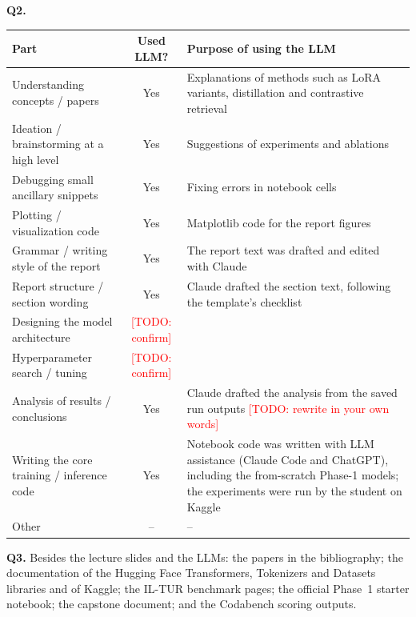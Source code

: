 \documentclass[10pt,a4paper]{article}
\newcommand{\todo}[1]{\textcolor{red}{[TODO: #1]}}
\begin{document}
\medskip\noindent\textbf{Q2.}
\begin{center}\small
\begin{tabular}{@{}p{4.6cm}|c|p{8.4cm}@{}}
\toprule
Part & Used LLM? & Purpose of using the LLM\\\midrule
Understanding concepts / papers & Yes & Explanations of methods such as LoRA variants, distillation and contrastive retrieval\\
Ideation / brainstorming at a high level & Yes & Suggestions of experiments and ablations\\
Debugging small ancillary snippets & Yes & Fixing errors in notebook cells\\
Plotting / visualization code & Yes & Matplotlib code for the report figures\\
Grammar / writing style of the report & Yes & The report text was drafted and edited with Claude\\
Report structure / section wording & Yes & Claude drafted the section text, following the template's checklist\\
Designing the model architecture & \todo{confirm} & \\
Hyperparameter search / tuning & \todo{confirm} & \\
Analysis of results / conclusions & Yes & Claude drafted the analysis from the saved run outputs \todo{rewrite in your own words}\\
Writing the core training / inference code & Yes & Notebook code was written with LLM assistance (Claude Code and ChatGPT), including the from-scratch Phase-1 models; the experiments were run by the student on Kaggle\\
Other & -- & --\\\bottomrule
\end{tabular}
\end{center}

\medskip\noindent\textbf{Q3.} Besides the lecture slides and the LLMs: the papers in the bibliography; the documentation of the Hugging Face Transformers, Tokenizers and Datasets libraries and of Kaggle; the IL-TUR benchmark pages; the official Phase~1 starter notebook; the capstone document; and the Codabench scoring outputs.
\end{document}
